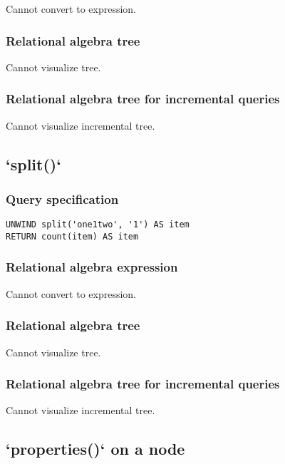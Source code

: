 Cannot convert to expression.

\subsubsection*{Relational algebra tree}

Cannot visualize tree.

\subsubsection*{Relational algebra tree for incremental queries}

Cannot visualize incremental tree.

\subsection{`split()`}

\subsubsection*{Query specification}

\begin{lstlisting}
UNWIND split('one1two', '1') AS item
RETURN count(item) AS item
\end{lstlisting}

\subsubsection*{Relational algebra expression}

Cannot convert to expression.

\subsubsection*{Relational algebra tree}

Cannot visualize tree.

\subsubsection*{Relational algebra tree for incremental queries}

Cannot visualize incremental tree.

\subsection{`properties()` on a node}


